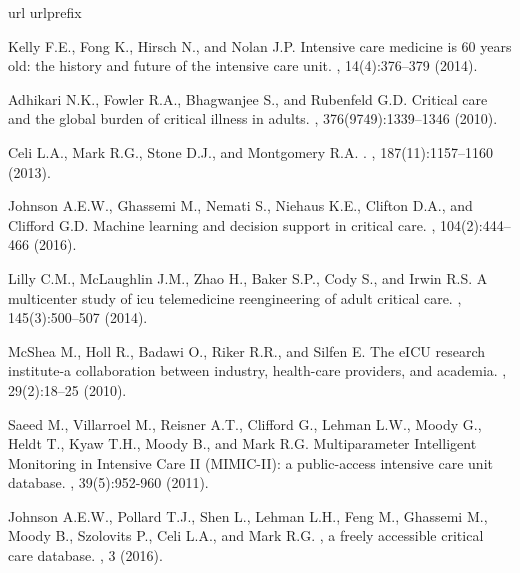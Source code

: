\documentclass[english]{article}
\begin{document}
\clearpage
\begin{thebibliography}{1}
\expandafter\ifx\csname url\endcsname\relax
  \def\url#1{\texttt{#1}}\fi
\expandafter\ifx\csname urlprefix\endcsname\relax\def\urlprefix{URL }\fi
\providecommand{\bibinfo}[2]{#2}
\providecommand{\eprint}[2][]{\url{#2}}

Kelly F.E., Fong K., Hirsch N., and Nolan J.P.
\newblock Intensive care medicine is 60 years old: the history and future of
  the intensive care unit.
, 14(4):376--379 (2014).

Adhikari N.K., Fowler R.A., Bhagwanjee S., and Rubenfeld G.D.
\newblock Critical care and the global burden of critical illness in adults.
, 376(9749):1339--1346 (2010).

Celi L.A., Mark R.G., Stone D.J., and Montgomery R.A.
.
, 187(11):1157--1160 (2013).

Johnson A.E.W., Ghassemi M., Nemati S., Niehaus K.E., Clifton D.A., and Clifford G.D.
\newblock Machine learning and decision support in critical care.
, 104(2):444--466 (2016).

Lilly C.M., McLaughlin J.M., Zhao H., Baker S.P., Cody S.,
  and Irwin R.S.
\newblock A multicenter study of icu telemedicine reengineering of adult
  critical care.
, 145(3):500--507 (2014).

McShea M., Holl R., Badawi O., Riker R.R., and Silfen E.
\newblock The {eICU} research institute-a collaboration between industry, health-care providers, and academia.
, 29(2):18--25 (2010).

Saeed M., Villarroel M., Reisner A.T., Clifford G., Lehman L.W., Moody G., Heldt T., Kyaw T.H., Moody B., and Mark R.G.
\newblock Multiparameter Intelligent Monitoring in Intensive Care {II} ({MIMIC-II}): a public-access intensive care unit database. , 39(5):952-960 (2011).

Johnson A.E.W., Pollard T.J., Shen L., Lehman L.H., Feng M., Ghassemi M., Moody B., Szolovits P., Celi L.A., and Mark R.G.
, a freely accessible critical care database.
, 3 (2016).


\end{thebibliography}
\end{document}

